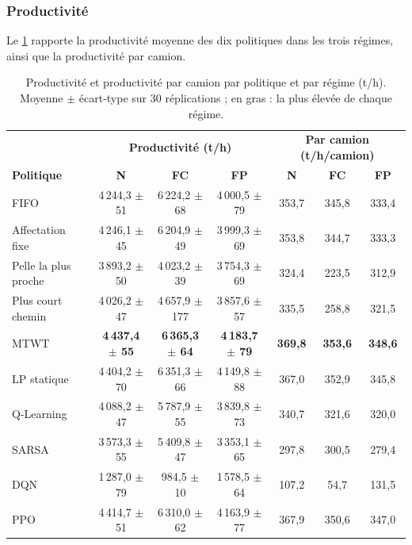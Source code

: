 \documentclass[11pt,a4paper]{article}
\newif\ifrevmarks
\newcommand{\revtag}[1]{\ifrevmarks\textsuperscript{\textcolor{red!70!black}{\scriptsize[#1]}}\fi}
\newenvironment{revbloc}[1]{\par\ifrevmarks\color{revcolor}\noindent\revtag{#1}\ \fi}{\par}
\newif\ifcorrmarks
\newcommand{\corr}[1]{\ifcorrmarks\textcolor{corrcolor}{#1}\else#1\fi}
\begin{document}
\subsubsection{Productivité}
\label{sec:productivity}

\begin{revbloc}{T31}
Le \cref{tab:productivity} rapporte la productivité moyenne des dix politiques dans les trois régimes, ainsi que la productivité par camion.

\begin{table}[H]
\centering
\caption{Productivité et productivité par camion par politique et par régime (t/h). Moyenne $\pm$ écart-type sur 30 réplications ; en gras : la plus élevée de chaque régime.}
\label{tab:productivity}
\footnotesize\setlength{\tabcolsep}{3pt}
\begin{tabular}{@{}lccc|ccc@{}}
\toprule
 & \multicolumn{3}{c|}{\textbf{Productivité (t/h)}} & \multicolumn{3}{c}{\textbf{Par camion (t/h/camion)}} \\
\textbf{Politique} & \textbf{N} & \textbf{FC} & \textbf{FP} & \textbf{N} & \textbf{FC} & \textbf{FP} \\
\midrule
FIFO                 & 4\,244,3 $\pm$ 51 & 6\,224,2 $\pm$ 68 & 4\,000,5 $\pm$ 79 & 353,7 & 345,8 & 333,4 \\
Affectation fixe     & 4\,246,1 $\pm$ 45 & 6\,204,9 $\pm$ 49 & 3\,999,3 $\pm$ 69 & 353,8 & 344,7 & 333,3 \\
Pelle la plus proche & 3\,893,2 $\pm$ 50 & 4\,023,2 $\pm$ 39 & 3\,754,3 $\pm$ 69 & 324,4 & 223,5 & 312,9 \\
Plus court chemin    & 4\,026,2 $\pm$ 47 & 4\,657,9 $\pm$ 177 & 3\,857,6 $\pm$ 57 & 335,5 & 258,8 & 321,5 \\
MTWT                 & \textbf{4\,437,4 $\pm$ 55} & \textbf{6\,365,3 $\pm$ 64} & \textbf{4\,183,7 $\pm$ 79} & \textbf{369,8} & \textbf{353,6} & \textbf{348,6} \\
\corr{LP statique}                   & 4\,404,2 $\pm$ 70 & 6\,351,3 $\pm$ 66 & 4\,149,8 $\pm$ 88 & 367,0 & 352,9 & 345,8 \\
\midrule
Q-Learning           & 4\,088,2 $\pm$ 47 & 5\,787,9 $\pm$ 55 & 3\,839,8 $\pm$ 73 & 340,7 & 321,6 & 320,0 \\
SARSA                & 3\,573,3 $\pm$ 55 & 5\,409,8 $\pm$ 47 & 3\,353,1 $\pm$ 65 & 297,8 & 300,5 & 279,4 \\
DQN                  & 1\,287,0 $\pm$ 79 & 984,5 $\pm$ 10 & 1\,578,5 $\pm$ 64 & 107,2 & 54,7 & 131,5 \\
PPO                  & 4\,414,7 $\pm$ 51 & 6\,310,0 $\pm$ 62 & 4\,163,9 $\pm$ 77 & 367,9 & 350,6 & 347,0 \\
\bottomrule
\end{tabular}
\end{table}


\end{revbloc}
\end{document}
